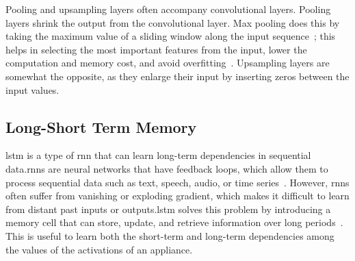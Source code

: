 Pooling and upsampling layers often accompany convolutional layers. Pooling layers shrink the output from the convolutional layer. Max pooling does this by taking the maximum value of a sliding window along the input sequence~\parencite{ahmadDeepLearningMultiscale2019}; this helps in selecting the most important features from the input, lower the computation and memory cost, and avoid overfitting~\parencite{zhangDiveDeepLearning2023,masciStackedConvolutionalAutoEncoders2011}. Upsampling layers are somewhat the opposite, as they enlarge their input by inserting zeros between the input values.

\subsection{Long-Short Term Memory}

\acrfull{lstm} is a type of \acrfull{rnn} that can learn long-term dependencies in sequential data.\@ \acrshort{rnn}s are neural networks that have feedback loops, which allow them to process sequential data such as text, speech, audio, or time series~\parencite{ahmadDeepLearningMultiscale2019}. However, \acrshort{rnn}s often suffer from vanishing or exploding gradient, which makes it difficult to learn from distant past inputs or outputs.\@ \acrshort{lstm} solves this problem by introducing a memory cell that can store, update, and retrieve information over long periods~\parencite{hochreiterLongShortTermMemory1997}. This is useful to learn both the short-term and long-term dependencies among the values of the activations of an appliance.


